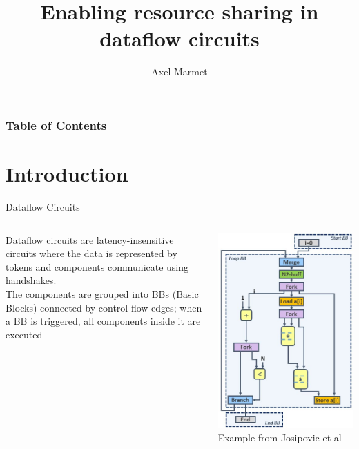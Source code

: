 \documentclass{beamer}
\title[Resource Sharing] %
{Enabling resource sharing in dataflow circuits}
\author[Marmet] %
{Axel Marmet}
\institute[EPFL] %
\date[2020] %
\begin{document}
\frame{\titlepage}


\begin{frame}
\frametitle{Table of Contents}
\tableofcontents
\end{frame}

\section{Introduction}
\begin{frame}{Dataflow Circuits}
    \begin{columns}[T]
    \begin{column}{0.45\textwidth}
        Dataflow circuits are latency-insensitive circuits where the data is represented by tokens and components communicate using handshakes. \\
       The components are grouped into BBs (Basic Blocks) connected by control flow edges; when a BB is triggered, all components inside it are executed
    \end{column}
    \begin{column}{0.45\textwidth}
        \begin{center}
      \includegraphics[scale=0.35]{datflow_example.jpg}
      Example from Josipovic et al\footnotemark
    \end{center}
    \end{column}
  \end{columns}
\end{frame}
\end{document}
